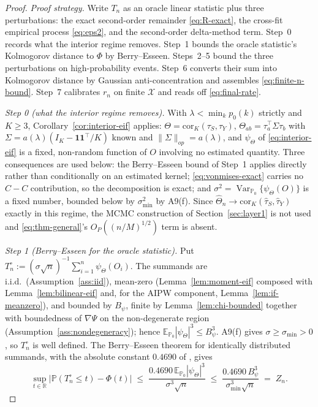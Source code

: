 \documentclass[11pt]{article}
\theoremstyle{plain}
\theoremstyle{definition}
\theoremstyle{remark}
\newcommand{\E}{\mathbb{E}}
\newcommand{\PP}{\mathbb{P}}
\newcommand{\R}{\mathbb{R}}
\newcommand{\cX}{\mathcal{X}}
\newcommand{\Thetahat}{\widehat{\Theta}}
\newcommand{\Corr}{\mathrm{cor}}
\DeclareMathOperator{\Var}{Var}
\begin{document}
\begin{proof}
\emph{Proof strategy.} Write $T_n$ as an oracle linear statistic plus three
perturbations: the exact second-order remainder \eqref{eq:R-exact}, the cross-fit
empirical process \eqref{eq:eps2}, and the second-order delta-method term. Step~0 records
what the interior regime removes. Step~1 bounds the oracle statistic's Kolmogorov distance
to $\Phi$ by Berry--Esseen. Steps~2--5 bound the three perturbations on
high-probability events. Step~6 converts their sum into Kolmogorov distance by
Gaussian anti-concentration and assembles \eqref{eq:finite-n-bound}. Step~7 calibrates
$r_n$ on finite $\cX$ and reads off \eqref{eq:final-rate}.

\emph{Step 0 (what the interior regime removes).} With $\lambda<\min_kp_0(k)$ strictly and
$K\ge3$, Corollary~\ref{cor:interior-eif} applies: $\Theta=\Corr_K(\tau_S,\tau_Y)$,
$\Theta_{ab}=\tau_a^\top\Sigma\tau_b$ with $\Sigma=a(\lambda)(I_K-\mathbf1\mathbf1^\top/K)$
known and $\|\Sigma\|_{op}=a(\lambda)$, and $\psi_\Theta$ of \eqref{eq:interior-eif} is a
fixed, non-random function of $O$ involving no estimated quantity. Three consequences are
used below: the Berry--Esseen bound of Step~1 applies directly rather than conditionally
on an estimated kernel; \eqref{eq:vonmises-exact} carries no $\hat C-C$ contribution, so
the decomposition is exact; and $\sigma^2=\Var_{\PP_0}\{\psi_\Theta(O)\}$ is a fixed
number, bounded below by $\sigma^2_{\min}$ by A9(f). Since
$\Thetahat_n\to\Corr_K(\hat\tau_S,\hat\tau_Y)$ exactly in this regime, the MCMC
construction of Section~\ref{sec:layer1} is not used and \eqref{eq:thm-general}'s
$O_P((n/M)^{1/2})$ term is absent.

\emph{Step 1 (Berry--Esseen for the oracle statistic).} Put
$T_n^\circ:=(\sigma\sqrt n)^{-1}\sum_{i=1}^n\psi_\Theta(O_i)$. The summands are i.i.d.\
(Assumption~\ref{ass:iid}), mean-zero (Lemma~\ref{lem:moment-eif} composed with
Lemma~\ref{lem:bilinear-eif} and, for the AIPW component,
Lemma~\ref{lem:if-meanzero}), and bounded by $B_\psi$, finite by
Lemma~\ref{lem:chi-bounded} together with boundedness of $\nabla\Psi$ on the
non-degenerate region (Assumption~\ref{ass:nondegeneracy}); hence
$\E_{\PP_0}|\psi_\Theta|^3\le B_\psi^3$. A9(f) gives $\sigma\ge\sigma_{\min}>0$, so
$T_n^\circ$ is well defined. The Berry--Esseen theorem for identically distributed
summands, with the absolute constant $0.4690$ of \citet{Shevtsova2011}, gives
\[
    \sup_{t\in\R}\big|\PP(T_n^\circ\le t)-\Phi(t)\big|
    \;\le\;\frac{0.4690\,\E_{\PP_0}|\psi_\Theta|^3}{\sigma^3\sqrt n}
    \;\le\;\frac{0.4690\,B_\psi^3}{\sigma_{\min}^3\sqrt n}\;=\;Z_n .
\]


\end{proof}
\end{document}

